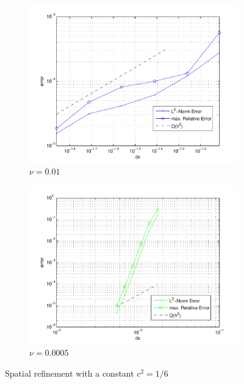 \begin{figure}[!tbhp]
\centering
	\begin{subfigure}{0.48\textwidth}
		\centering
		\includegraphics[width=\textwidth]{./figures/wErrorVSdx_nu0p01_constantc2.pdf}	
		\caption{$\nu=0.01$}
	\end{subfigure}
	\begin{subfigure}{0.48\textwidth}
		\centering
		\includegraphics[width=\textwidth]{./figures/wErrorVSdx_nu0p0005_constantc2.pdf}	
		\caption{$\nu=0.0005$}
	\end{subfigure}
\caption{Spatial refinement with a constant $c^2=1/6$}
\label{fig:wErrorVSdx_constantC2}
\end{figure}

